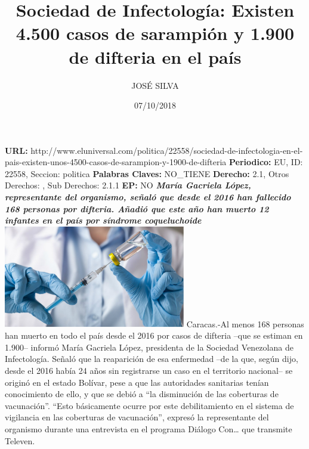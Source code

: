 \documentclass{article}%
\title{\textbf{Sociedad de Infectología: Existen 4.500 casos de sarampión y 1.900 de difteria en el país}}%
\author{JOSÉ SILVA}%
\date{07/10/2018}%
\begin{document}
%
\normalsize%
\maketitle%
\textbf{URL: }%
http://www.eluniversal.com/politica/22558/sociedad{-}de{-}infectologia{-}en{-}el{-}pais{-}existen{-}unos{-}4500{-}casos{-}de{-}sarampion{-}y{-}1900{-}de{-}difteria\newline%
%
\textbf{Periodico: }%
EU, %
ID: %
22558, %
Seccion: %
politica\newline%
%
\textbf{Palabras Claves: }%
NO\_TIENE\newline%
%
\textbf{Derecho: }%
2.1, %
Otros Derechos: %
, %
Sub Derechos: %
2.1.1\newline%
%
\textbf{EP: }%
NO\newline%
\newline%
%
\textbf{\textit{María Gacriela López, representante del organismo, señaló que desde el 2016 han fallecido 168 personas por difteria. Añadió que este año han muerto 12 infantes en el país por síndrome coqueluchoide}}%
\newline%
\newline%
%
\includegraphics[width=300px]{227.jpg}%
\newline%
%
Caracas.{-}Al menos 168 personas han muerto en todo el país desde el 2016 por casos de difteria –que se estiman en 1.900– informó María Gacriela López, presidenta de la Sociedad Venezolana de Infectología.%
\newline%
%
Señaló que la reaparición de esa enfermedad –de la que, según dijo, desde el 2016 había 24 años sin registrarse un caso en el territorio nacional– se originó en el estado Bolívar, pese a que las autoridades sanitarias tenían conocimiento de ello, y que se debió a “la disminución de las coberturas de vacunación”.%
\newline%
%
“Esto básicamente ocurre por este debilitamiento en el sistema de vigilancia en las coberturas de vacunación”, expresó la representante del organismo durante una entrevista en el programa Diálogo Con… que transmite Televen.%
\newline%
\end{document}
